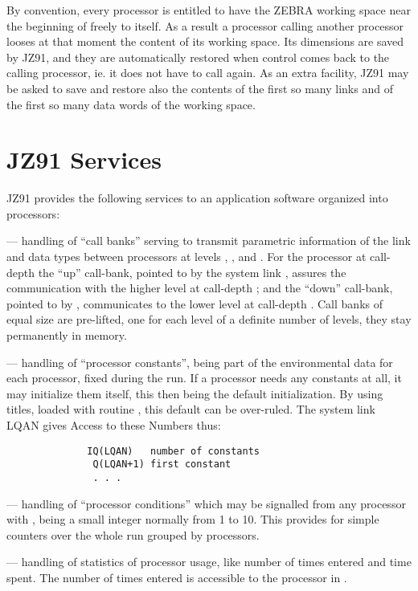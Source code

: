 By convention, every processor is entitled to have
the ZEBRA working space near the beginning of 
freely to itself.
As a result a processor calling another processor
looses at that moment the content of its working space.
Its dimensions are saved by JZ91,
and they are automatically restored when control
comes back to the calling processor,
ie. it does not have to call  again.
As an extra facility, JZ91 may be asked to save and restore
also the contents of the first so many links
and of the first so many data words of the working space.

\newpage
{}
\section{JZ91 Services}

JZ91 provides the following services
to an application software organized into processors:

--- handling of ``call banks'' serving to transmit parametric
information of the link and data types
between processors at levels , , and .
For the processor at call-depth  the ``up'' call-bank,
pointed to by the system link ,
assures the communication with the higher level at
call-depth ;
and the ``down'' call-bank,
pointed to by ,
communicates to the lower level at call-depth .
Call banks of equal size are pre-lifted,
one for each level of a definite number of levels,
they stay permanently in memory.

--- handling of ``processor constants'',
being part of the environmental data for each processor,
fixed during the run.
If a processor needs any constants at all,
it may initialize them itself,
this then being the default initialization.
By using titles, loaded with routine ,
this default can be over-ruled.
The system link LQAN gives Access to these Numbers thus:

\begin{verbatim}
              IQ(LQAN)   number of constants
               Q(LQAN+1) first constant
               . . .
\end{verbatim}

--- handling of ``processor conditions'' which may be signalled from
any processor with  ,
 being a small integer normally from 1 to 10.
This provides for simple counters over the whole run
grouped by processors.

--- handling of statistics of processor usage,
like number of times entered and time spent.
The number of times entered is accessible to
the processor in  .

